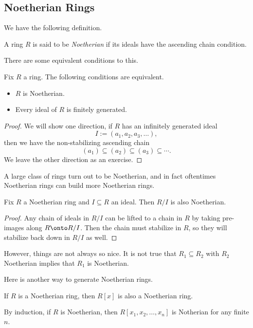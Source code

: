 \subsection{Noetherian Rings}
We have the following definition.
\begin{definition}
	A ring $R$ is said to be \textit{Noetherian} if its ideals have the ascending chain condition.
\end{definition}
There are some equivalent conditions to this.
\begin{proposition}
	Fix $R$ a ring. The following conditions are equivalent.
	\begin{itemize}
		\item $R$ is Noetherian.
		\item Every ideal of $R$ is finitely generated.
	\end{itemize}
\end{proposition}
\begin{proof}
	We will show one direction, if $R$ has an infinitely generated ideal
	\[I:=(a_1,a_2,a_3,\ldots),\]
	then we have the non-stabilizing ascending chain
	\[(a_1)\subseteq(a_2)\subseteq(a_3)\subseteq\cdots.\]
	We leave the other direction as an exercise.
\end{proof}
A large class of rings turn out to be Noetherian, and in fact oftentimes Noetherian rings can build more Noetherian rings.
\begin{prop}
	Fix $R$ a Noetherian ring and $I\subseteq R$ an ideal. Then $R/I$ is also Noetherian.
\end{prop}
\begin{proof}
	Any chain of ideals in $R/I$ can be lifted to a chain in $R$ by taking pre-images along $R\onto R/I$. Then the chain must stabilize in $R$, so they will stabilize back down in $R/I$ as well.
\end{proof}
However, things are not always so nice. It is not true that $R_1\subseteq R_2$ with $R_2$ Noetherian implies that $R_1$ is Noetherian.
\begin{nex}
	
\end{nex}
Here is another way to generate Noetherian rings.
\begin{theorem} \label{thm:hilbasis}
	If $R$ is a Noetherian ring, then $R[x]$ is also a Noetherian ring.
\end{theorem}
\begin{corollary}
	By induction, if $R$ is Noetherian, then $R[x_1,x_2,\ldots,x_n]$ is Notherian for any finite $n$.
\end{corollary}

